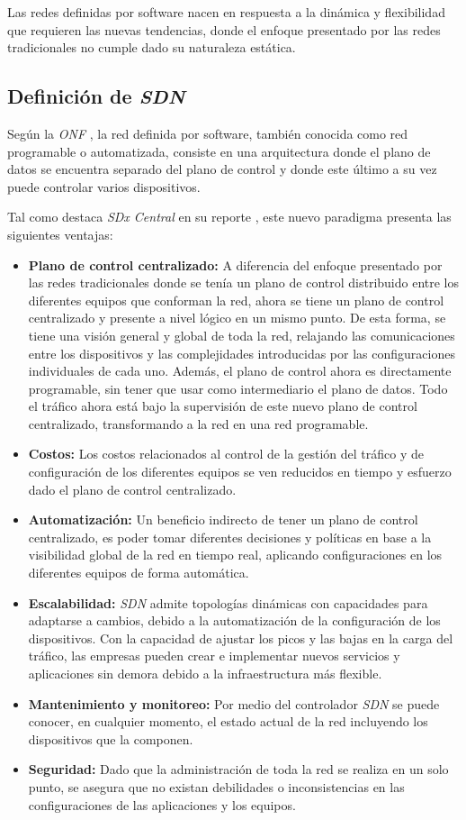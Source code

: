 Las redes definidas por software nacen en respuesta a la dinámica y flexibilidad que requieren las nuevas tendencias, donde el enfoque presentado por las redes tradicionales no cumple dado su naturaleza estática. 

\subsection{Definición de \textit{SDN}}
Según la \textit{ONF} \parencite{onfwhitepaper}, la red definida por software, también conocida como red programable o automatizada, consiste en una arquitectura donde el plano de datos se encuentra separado del plano de control y donde este último a su vez puede controlar varios dispositivos.

Tal como destaca \textit{SDx Central} en su reporte \parencite{SDXCentralReport}, este nuevo paradigma presenta las siguientes ventajas:

\begin{itemize}
	\item \textbf{Plano de control centralizado:} A diferencia del enfoque presentado por las redes tradicionales donde se tenía un plano de control distribuido entre los diferentes equipos que conforman la red, ahora se tiene un plano de control centralizado y presente a nivel lógico en un mismo punto. De esta forma, se tiene una visión general y global de toda la red, relajando las comunicaciones entre los dispositivos y las complejidades introducidas por las configuraciones individuales de cada uno. Además, el plano de control ahora es directamente programable, sin tener que usar como intermediario el plano de datos. Todo el tráfico ahora está bajo la supervisión de este nuevo plano de control centralizado, transformando a la red en una red programable. 
	\item \textbf{Costos:} Los costos relacionados al control de la gestión del tráfico y de configuración de los diferentes equipos se ven reducidos en tiempo y esfuerzo dado el plano de control centralizado.
	\item \textbf{Automatización:} Un beneficio indirecto de tener un plano de control centralizado, es poder tomar diferentes decisiones y políticas en base a la visibilidad global de la red en tiempo real, aplicando configuraciones en los diferentes equipos de forma automática.
	\item \textbf{Escalabilidad:} \textit{SDN} admite topologías dinámicas con capacidades para adaptarse a cambios, debido a la automatización de la configuración de los dispositivos. Con la capacidad de ajustar los picos y las bajas en la carga del tráfico, las empresas pueden crear e implementar nuevos servicios y aplicaciones sin demora debido a la infraestructura más flexible.
	\item \textbf{Mantenimiento y monitoreo:} Por medio del controlador \textit{SDN} se puede conocer, en cualquier momento, el estado actual de la red incluyendo los dispositivos que la componen.
	\item \textbf{Seguridad:} Dado que la administración de toda la red se realiza en un solo punto, se asegura que no existan debilidades o inconsistencias en las configuraciones de las aplicaciones y los equipos.
\end{itemize}

